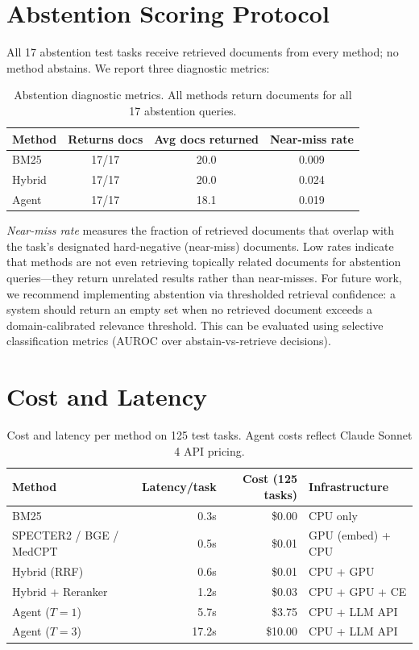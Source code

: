 \documentclass{article}
\begin{document}
\section{Abstention Scoring Protocol}
\label{app:abstention_protocol}

All 17 abstention test tasks receive retrieved documents from every method; no method abstains. We report three diagnostic metrics:

\begin{table}[h]
\centering
\caption{Abstention diagnostic metrics. All methods return documents for all 17 abstention queries.}
\small
\begin{tabular}{lccc}
\toprule
\textbf{Method} & \textbf{Returns docs} & \textbf{Avg docs returned} & \textbf{Near-miss rate} \\
\midrule
BM25 & 17/17 & 20.0 & 0.009 \\
Hybrid & 17/17 & 20.0 & 0.024 \\
Agent & 17/17 & 18.1 & 0.019 \\
\bottomrule
\end{tabular}
\end{table}

\emph{Near-miss rate} measures the fraction of retrieved documents that overlap with the task's designated hard-negative (near-miss) documents. Low rates indicate that methods are not even retrieving topically related documents for abstention queries---they return unrelated results rather than near-misses. For future work, we recommend implementing abstention via thresholded retrieval confidence: a system should return an empty set when no retrieved document exceeds a domain-calibrated relevance threshold. This can be evaluated using selective classification metrics (AUROC over abstain-vs-retrieve decisions).

\section{Cost and Latency}
\label{app:cost}

\begin{table}[h]
\centering
\caption{Cost and latency per method on 125 test tasks. Agent costs reflect Claude Sonnet 4 API pricing.}
\small
\begin{tabular}{lrrl}
\toprule
\textbf{Method} & \textbf{Latency/task} & \textbf{Cost (125 tasks)} & \textbf{Infrastructure} \\
\midrule
BM25 & 0.3s & \$0.00 & CPU only \\
SPECTER2 / BGE / MedCPT & 0.5s & \$0.01 & GPU (embed) + CPU \\
Hybrid (RRF) & 0.6s & \$0.01 & CPU + GPU \\
Hybrid + Reranker & 1.2s & \$0.03 & CPU + GPU + CE \\
Agent ($T{=}1$) & 5.7s & \$3.75 & CPU + LLM API \\
Agent ($T{=}3$) & 17.2s & \$10.00 & CPU + LLM API \\
\bottomrule
\end{tabular}
\end{table}
\end{document}
